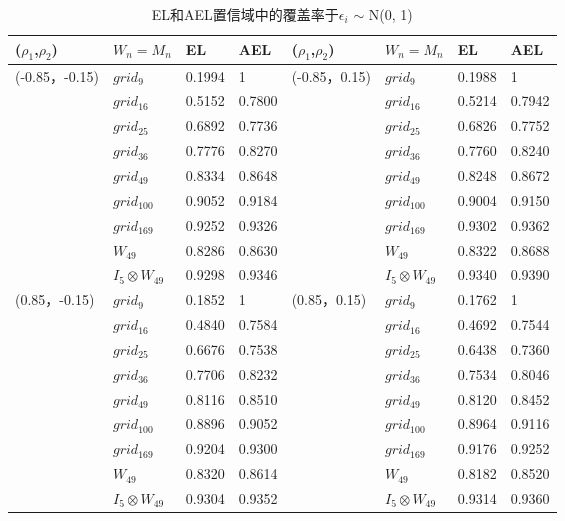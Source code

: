 \documentclass[a4paper,c5size,onecolumn,twoside,cap,Chinese]{APSart}
\begin{document}
\begin{table}[htbp]
\setlength{\abovecaptionskip}{0cm}%
\centering
\caption{EL和AEL置信域中的覆盖率于$\epsilon_{i}$ $\sim$ N(0, 1)\label{table:1}}
\begin{tabular*}{\hsize}{@{}@{\extracolsep{\fill}}llllllll@{}}
\hline
($\rho_{1}$,$\rho_{2}$)&$W_n=M_n$ & EL&AEL&($\rho_{1}$,$\rho_{2}$)&$W_n=M_n$ & EL&AEL\\
\hline
(-0.85，-0.15)& $grid_{9}$  	 & 0.1994 & 1          &  (-0.85，0.15)	& $grid_{9}$ & 0.1988 & 1   \\
		& $grid_{16}$   	& 0.5152 & 0.7800 	&                 		& $grid_{16}$  & 0.5214 & 0.7942 \\
		& $grid_{25}$   	& 0.6892 & 0.7736 	&                 		& $grid_{25}$  & 0.6826 & 0.7752 \\
		& $grid_{36}$   	& 0.7776 & 0.8270	&                	 	& $grid_{36}$  & 0.7760 & 0.8240\\
		& $grid_{49}$   	& 0.8334 & 0.8648 	&                 		& $grid_{49}$  & 0.8248 & 0.8672\\
                      & $grid_{100}$ 	& 0.9052 & 0.9184 	&                 		& $grid_{100}$ & 0.9004 & 0.9150\\
                      & $grid_{169}$ 	& 0.9252 & 0.9326 	&                 		& $grid_{169}$ & 0.9302 & 0.9362 \\
                      & $W_{49}$ 	& 0.8286 & 0.8630 	&                 		& $W_{49}$ & 0.8322 & 0.8688 \\
                      & $I_{5}\otimes W_{49}$&0.9298& 0.9346 &     &$I_{5}\otimes W_{49}$&0.9340 &0.9390   \\
\hline
(0.85，-0.15) & $grid_{9}$   	& 0.1852 & 1           &  (0.85，0.15)	& $grid_{9}$  & 0.1762 & 1	\\
		& $grid_{16}$   	& 0.4840 & 0.7584	&                 		& $grid_{16}$ & 0.4692 & 0.7544\\
		& $grid_{25}$   	& 0.6676 & 0.7538	&                 		& $grid_{25}$ & 0.6438 & 0.7360\\
		& $grid_{36}$   	& 0.7706 & 0.8232  &                 		& $grid_{36}$ & 0.7534 & 0.8046 \\
		& $grid_{49}$   	& 0.8116 & 0.8510  &                  		& $grid_{49}$ & 0.8120 & 0.8452\\
                      & $grid_{100}$ 	& 0.8896 & 0.9052  &                 		& $grid_{100}$ & 0.8964 & 0.9116\\
                      & $grid_{169}$ 	& 0.9204 & 0.9300     &           		& $grid_{169}$ & 0.9176 & 0.9252\\
                      & $W_{49}$ 	& 0.8320 & 0.8614  &                 		&  $W_{49}$ & 0.8182 & 0.8520  \\
                      & $I_{5}\otimes W_{49}$&  0.9304 &0.9352	&     &$I_{5}\otimes W_{49}$&  0.9314 &0.9360   \\
\hline
\end{tabular*}
\end{table}
\end{document}
